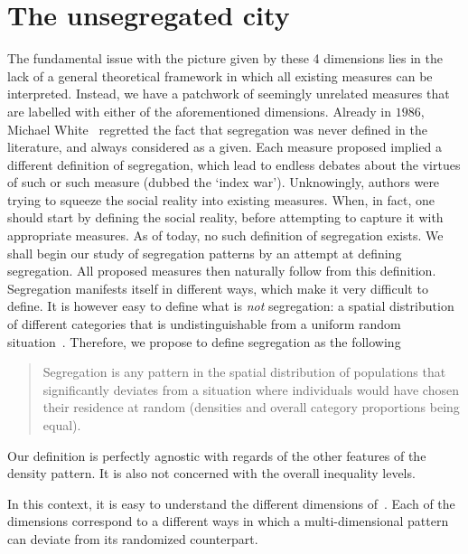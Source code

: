 \section{The unsegregated city}
\label{sec:null_model_the_unsegregated_city}

The fundamental issue with the picture given by these 4 dimensions lies in the
lack of a general theoretical framework in which all existing measures can be
interpreted.  Instead, we have a patchwork of seemingly unrelated measures that
are labelled with either of the aforementioned dimensions. Already in $1986$,
Michael White~\cite{White:1986} regretted the fact that segregation was never
defined in the literature, and always considered as a given. Each measure
proposed implied a different definition of segregation, which lead to endless
debates about the virtues of such or such measure (dubbed the `index war').
Unknowingly, authors were trying to squeeze the social reality into existing
measures. When, in fact, one should start by defining the social reality, before
attempting to capture it with appropriate measures. As of today, no such
definition of segregation exists. We shall begin our study of segregation
patterns by an attempt at defining segregation. All proposed measures then
naturally follow from this definition.\\

Segregation manifests itself in different ways, which make it very difficult to
define. It is however easy to define what is \emph{not} segregation: a spatial
distribution of different categories that is undistinguishable from a uniform
random situation~\cite{Jahn:1947}. Therefore, we propose to define segregation
as the following

\begin{quote}
Segregation is any pattern in the spatial distribution of populations that
significantly deviates from a situation where individuals would have chosen
their residence at random (densities and overall category proportions being
equal).  
\end{quote} 

Our definition is perfectly agnostic with regards of the other features of the
density pattern. It is also not concerned with the overall inequality levels.

In this context, it is easy to understand the different dimensions
of~\cite{Massey:1988,Reardon:2004}. Each of the dimensions correspond to a
different ways in which a multi-dimensional pattern can deviate from its
randomized counterpart. \\

